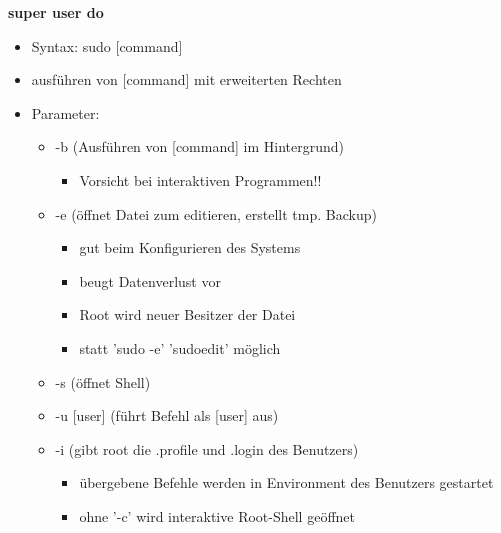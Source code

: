 \documentclass[12pt,utf8, 10pt]{article}
\begin{document}
\textbf{super user do}
\begin{itemize}
	\item Syntax: sudo [command]
	\item ausführen von [command] mit erweiterten Rechten
	\item Parameter:
	\begin{itemize}
		\item -b (Ausführen von [command] im Hintergrund)
		\begin{itemize}
			\item Vorsicht bei interaktiven Programmen!!
		\end{itemize}
		\item -e (öffnet Datei zum editieren, erstellt tmp. Backup)
		\begin{itemize}
			\item gut beim Konfigurieren des Systems
			\item beugt Datenverlust vor
			\item Root wird neuer Besitzer der Datei
			\item statt 'sudo -e' 'sudoedit' möglich
		\end{itemize}
		\item -s (öffnet Shell)
		\item -u [user] (führt Befehl als [user] aus)
		\item -i (gibt root die .profile und .login des Benutzers)
		\begin{itemize}
			\item übergebene Befehle werden in Environment des Benutzers gestartet
			\item ohne '-c' wird interaktive Root-Shell geöffnet
		\end{itemize}
	\end{itemize}
\end{itemize}
\end{document}
